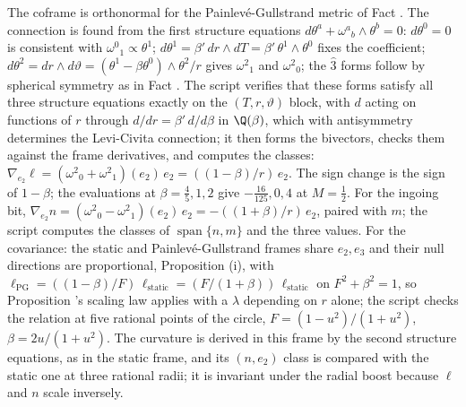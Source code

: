The coframe is orthonormal for the Painlev\'e-Gullstrand metric of Fact . The connection is found from the first structure equations $d\theta^{a} + \omega^{a}{}_{b}\wedge\theta^{b} = 0$: $d\theta^{0} = 0$ is consistent with $\omega^{0}{}_{1} \propto \theta^{1}$; $d\theta^{1} = \beta'\,dr\wedge dT = \beta'\,\theta^{1}\wedge\theta^{0}$ fixes the coefficient; $d\theta^{2} = dr\wedge d\vartheta = (\theta^{1} - \beta\theta^{0})\wedge\theta^{2}/r$ gives $\omega^{2}{}_{1}$ and $\omega^{2}{}_{0}$; the $\hat3$ forms follow by spherical symmetry as in Fact . The script verifies that these forms satisfy all three structure equations exactly on the $(T, r, \vartheta)$ block, with $d$ acting on functions of $r$ through $d/dr = \beta'\,d/d\beta$ in $\Q(\beta)$, which with antisymmetry determines the Levi-Civita connection; it then forms the bivectors, checks them against the frame derivatives, and computes the classes: $\nabla_{e_{2}}\ell = (\omega^{2}{}_{0} + \omega^{2}{}_{1})(e_{2})\,e_{2} = ((1 - \beta)/r)\,e_{2}$. The sign change is the sign of $1 - \beta$; the evaluations at $\beta = \tfrac45, 1, 2$ give $-\tfrac{16}{125}, 0, 4$ at $M = \tfrac12$. For the ingoing bit, $\nabla_{e_{2}}n = (\omega^{2}{}_{0} - \omega^{2}{}_{1})(e_{2})\,e_{2} = -((1 + \beta)/r)\,e_{2}$, paired with $m$; the script computes the classes of $\operatorname{span}\{n, m\}$ and the three values. For the covariance: the static and Painlev\'e-Gullstrand frames share $e_{2}, e_{3}$ and their null directions are proportional, Proposition (i), with $\ell_{\mathrm{PG}} = ((1 - \beta)/F)\,\ell_{\mathrm{static}} = (F/(1 + \beta))\,\ell_{\mathrm{static}}$ on $F^{2} + \beta^{2} = 1$, so Proposition 's scaling law applies with a $\lambda$ depending on $r$ alone; the script checks the relation at five rational points of the circle, $F = (1 - u^{2})/(1 + u^{2})$, $\beta = 2u/(1 + u^{2})$. The curvature is derived in this frame by the second structure equations, as in the static frame, and its $(n, e_{2})$ class is compared with the static one at three rational radii; it is invariant under the radial boost because $\ell$ and $n$ scale inversely.
